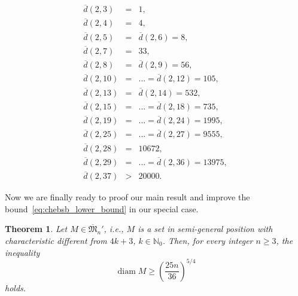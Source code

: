 \documentclass[a4paper,14pt]{article} %
\theoremstyle{plain}
\newtheorem{theorem}{Theorem}[section]
\theoremstyle{definition}
\begin{document}
\begin{eqnarray}
\label{d}
\overline{d}(2,3)&=& 1,{}\nonumber\\
\overline{d}(2,4)&=& 4,{}\nonumber\\
\overline{d}(2,5)&=&  \overline{d}(2,6)= 8,{}\nonumber\\
\overline{d}(2,7)&=& 33,{}\nonumber\\
\overline{d}(2,8)&=&  \overline{d}(2,9)= 56,{}\nonumber\\
\overline{d}(2,10)&=& ... =\overline{d}(2,12)= 105,{}\nonumber\\
\overline{d}(2,13)&=&  \overline{d}(2,14)= 532,{}\nonumber\\
\overline{d}(2,15)&=&  ... = \overline{d}(2,18) = 735,{}\nonumber\\
\overline{d}(2,19)&=& ... = \overline{d}(2,24) = 1995,{}\nonumber\\
\overline{d}(2,25)&=&  ... = \overline{d}(2,27)= 9555,{}\nonumber\\
\overline{d}(2,28)&=& 10672,{}\nonumber\\
\overline{d}(2,29)&=&  ... = \overline{d}(2,36) = 13975,{}\nonumber\\
\overline{d}(2,37) &>& 20000.
\end{eqnarray}


Now we are finally ready to proof our main result and improve the bound~\eqref{eq:chebsb_lower_bound}
in our special case.

\begin{theorem}
	\label{thm:main_result}
	Let $M \in \overline{\mathfrak{M}}_n'$, i.e., $M$ is a set in semi-general position with characteristic different from $4k+3$, $k \in \mathbb{N}_0$.
	Then, for every integer $n \geq 3$, the inequality
	\begin{equation}
		\operatorname{diam} M \geq \left( \frac{25n}{36} \right)^{5/4}
	\end{equation}
	holds.
\end{theorem}
\end{document}
